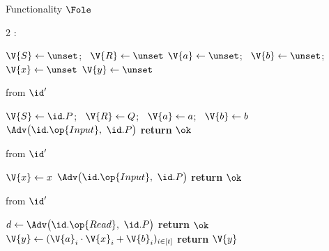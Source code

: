 \begin{interface}[nofloat]{Functionality $\Fole$ \\
}

{\scriptsize
\setlength{\columnsep}{1.4em}
\begin{multicols}{2}
:
\begin{algorithmic}[1]
\setcounter{contline}{0}\algcont
\State $\V{S} \gets \unset$; \ $\V{R} \gets \unset$
\State $\V{a} \gets \unset$; \ $\V{b} \gets \unset$; \ $\V{x} \gets \unset$
\State $\V{y} \gets \unset$
\algsave
\end{algorithmic}
\vspace{1.4ex}

 \quad from $\id'$
\begin{algorithmic}[1]
\algcont
{} \label{ln:oleonces}
\State $\V{S} \gets \id.P$; \ $\V{R} \gets Q$; \ $\V{a} \gets a$; \ $\V{b} \gets b$
\State $\Adv\bigl(\id.\op{Input},\ \id.P\bigr)$ \label{ln:olenotifys}
\State \textbf{return} $\ok$
\algsave
\end{algorithmic}
\vspace{1.4ex}

 \quad from $\id'$
\begin{algorithmic}[1]
\algcont
{} \label{ln:oleoncer}
\State $\V{x} \gets x$
\State $\Adv\bigl(\id.\op{Input},\ \id.P\bigr)$
\State \textbf{return} $\ok$
\algsave
\end{algorithmic}
\vspace{1.4ex}

\columnbreak

 \quad from $\id'$
\begin{algorithmic}[1]
\algcont
{} \label{ln:oleboth}
\State $d \gets \Adv\bigl(\id.\op{Read},\ \id.P\bigr)$ \label{ln:oledeliver}
  \State \textbf{return} $\ok$ \label{ln:olesender}
\EndIf
{}
\State $\V{y} \gets (\V{a}_{i} \cdot \V{x}_{i} + \V{b}_{i})_{i \in [t]}$ \label{ln:olecompute}
\State \textbf{return} $\V{y}$ \label{ln:oleout}
\algsave
\end{algorithmic}
\vspace{1.4ex}


\end{multicols}}
\end{interface}
